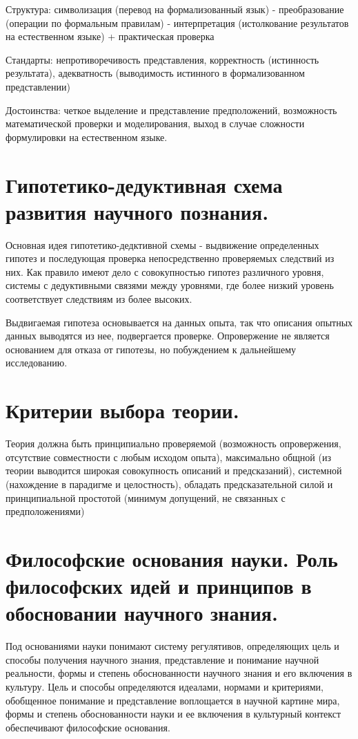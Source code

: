 \documentclass[12pt, specialist, subf, substylefile = spbu.rtx]{disser}
\begin{document}
Структура: символизация (перевод на формализованный язык) - преобразование (операции по формальным правилам) - интерпретация (истолкование результатов на естественном языке) + практическая проверка

Стандарты: непротиворечивость представления, корректность (истинность результата), адекватность (выводимость истинного в формализованном представлении)

Достоинства: четкое выделение и представление предположений, возможность математической проверки и моделирования, выход в случае сложности формулировки на естественном языке.

\section{Гипотетико-дедуктивная схема развития научного познания.}
Основная идея гипотетико-дедктивной схемы - выдвижение определенных гипотез и последующая проверка непосредственно проверяемых следствий из них. Как правило имеют дело с совокупностью гипотез различного уровня, системы с дедуктивными связями между уровнями, где более низкий уровень соответствует следствиям из более высоких.

Выдвигаемая гипотеза основывается на данных опыта, так что описания опытных данных выводятся из нее, подвергается проверке. Опровержение не является основанием для отказа от гипотезы, но побуждением к дальнейшему исследованию.

\section{Критерии выбора теории.}
Теория должна быть принципиально проверяемой (возможность опровержения, отсутствие совместности с любым исходом опыта), максимально общной (из теории выводится широкая совокупность описаний и предсказаний), системной (нахождение в парадигме и целостность), обладать предсказательной силой и принципиальной простотой (минимум допущений, не связанных с предположениями)

\section{Философские основания науки. Роль философских идей и принципов в обосновании научного знания.}
Под основаниями науки понимают систему регулятивов, определяющих цель и способы получения научного знания, представление и понимание научной реальности, формы и степень обоснованности научного знания и его включения в культуру. Цель и способы определяются идеалами, нормами и критериями, обобщенное понимание и представление воплощается в научной картине мира, формы и степень обоснованности науки и ее включения в культурный контекст обеспечивают философские основания.
\end{document}

